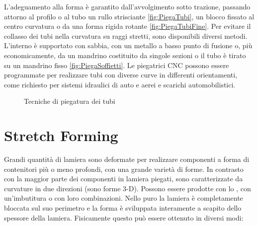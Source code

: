 L'adeguamento alla forma è garantito dall'avvolgimento sotto trazione, passando attorno al profilo o al tubo un rullo strisciante \ref{fig:PiegaTubi}, un blocco fissato al centro curvatura o da una forma rigida rotante \ref{fig:PiegaTubiFine}.
Per evitare il collasso dei tubi nella curvatura su raggi stretti, sono disponibili diversi metodi.
L'interno è supportato con sabbia, con un metallo a basso punto di fusione o, più economicamente, da un mandrino costituito da singole sezioni o il tubo è tirato su un mandrino fisso \ref{fig:PiegaSoffietti}.
Le piegatrici \ac{CNC} possono essere programmate per realizzare tubi con diverse curve in differenti orientamenti, come richiesto per sistemi idraulici di auto e aerei e scarichi automobilistici.

\begin{figure}
\centering
{}\quad
{}\quad
{}
\caption{Tecniche di piegatura dei tubi}
\label{fig:TecPiegaTubi}
\end{figure}

\section{Stretch Forming}
Grandi quantità di lamiera sono deformate per realizzare componenti a forma di contenitori più o meno profondi, con una grande varietà di forme. In contrasto con la maggior parte dei componenti in lamiera piegati, sono caratterizzate da curvature in due direzioni (sono forme 3-D). Possono essere prodotte con lo , con un'imbutitura o con loro combinazioni. Nello  puro la lamiera è completamente bloccata sul suo perimetro e la forma è sviluppata interamente a scapito dello spessore della lamiera. Fisicamente questo può essere ottenuto in diversi modi:

